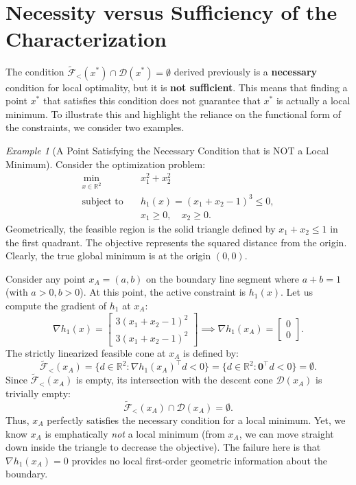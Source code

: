 \documentclass[11pt]{article}
\theoremstyle{definition}
\theoremstyle{plain}
\theoremstyle{remark}
\newtheorem{example}{Example}
\begin{document}
\section{Necessity versus Sufficiency of the Characterization}

The condition $\widetilde{\mathcal{F}}_{<}(x^*) \cap \mathcal{D}(x^*) = \emptyset$ derived previously is a \textbf{necessary} condition for local optimality, but it is \textbf{not sufficient}. This means that finding a point $x^*$ that satisfies this condition does not guarantee that $x^*$ is actually a local minimum. To illustrate this and highlight the reliance on the functional form of the constraints, we consider two examples.

\begin{example}[A Point Satisfying the Necessary Condition that is NOT a Local Minimum]
  Consider the optimization problem:
  \begin{align*}
    \min_{x \in \mathbb{R}^2} \quad & x_1^2 + x_2^2 \\
    \text{subject to} \quad & h_1(x) = (x_1 + x_2 - 1)^3 \leq 0, \\
    & x_1 \geq 0, \quad x_2 \geq 0.
  \end{align*}
  Geometrically, the feasible region is the solid triangle defined by $x_1+x_2 \leq 1$ in the first quadrant. The objective represents the squared distance from the origin. Clearly, the true global minimum is at the origin $(0,0)$.
  
  Consider any point $x_A = (a,b)$ on the boundary line segment where $a+b=1$ (with $a > 0, b > 0$). At this point, the active constraint is $h_1(x)$. Let us compute the gradient of $h_1$ at $x_A$:
  \[
    \nabla h_1(x) = \begin{bmatrix} 3(x_1 + x_2 - 1)^2 \\ 3(x_1 + x_2 - 1)^2 \end{bmatrix} \implies \nabla h_1(x_A) = \begin{bmatrix} 0 \\ 0 \end{bmatrix}.
  \]
  The strictly linearized feasible cone at $x_A$ is defined by:
  \[
    \widetilde{\mathcal{F}}_{<}(x_A) = \{ d \in \mathbb{R}^2 : \nabla h_1(x_A)^\top d < 0 \} = \{ d \in \mathbb{R}^2 : \mathbf{0}^\top d < 0 \} = \emptyset.
  \]
  Since $\widetilde{\mathcal{F}}_{<}(x_A)$ is empty, its intersection with the descent cone $\mathcal{D}(x_A)$ is trivially empty:
  \[
    \widetilde{\mathcal{F}}_{<}(x_A) \cap \mathcal{D}(x_A) = \emptyset.
  \]
  Thus, $x_A$ perfectly satisfies the necessary condition for a local minimum. Yet, we know $x_A$ is emphatically \emph{not} a local minimum (from $x_A$, we can move straight down inside the triangle to decrease the objective). The failure here is that $\nabla h_1(x_A) = 0$ provides no local first-order geometric information about the boundary.
\end{example}
\end{document}
